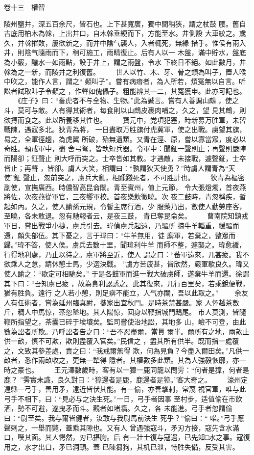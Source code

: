 \documentclass{ctexart}
\begin{document}
卷十三　權智

陵州鹽井，深五百余尺，皆石也。上下甚寬廣，獨中間稍狹，謂之杖鼓 腰。舊自吉底用柏木為榦，上出井口，自木榦垂綆而下，方能至水。井側設 大車絞之。歲久，井榦摧敗，屢欲新之，而井中陰气襲人，入者輒死，無緣 措手。惟侯有雨入井，則陰气隨雨而下，稍可施工，雨睛復止。后有人以一 木盤，滿中貯水，盤底為小竅，釃水一如雨點，設于井上，謂之雨盤，令水 下終日不絕。如此數月，井榦為之一新，而陵井之利復舊。 　　世人以竹、木、牙、骨之類為叫子，置人喉中吹之，能作人言，謂之`` 顙叫子''。嘗有病瘖者，為人所若，煩冤無以自言。听訟者試取叫子令顙之 ，作聲如傀儡子。粗能辨其一二，其冤獲申。此亦可記也。 　　《庄子》曰：``畜虎者不与全物、生物。''此為誠言。嘗有人善調山鷓 ，使之斗，莫可与敵。人有得其術者，每食則以山鷓皮裹肉哺之，久之，望 見其鷓，則欲搏而食之。此以所養移其性也。 　　寶元中，党項犯塞，時新募万胜軍，未習戰陳，遇寇多北。狄青為將， 一日盡取万胜旗付虎冀軍，使之出戰。虜望其旗，易之，全軍徑趨，為虎翼 所破，殆無遺類。又青在涇、原，嘗以寡當眾，度必以奇胜。預戒軍中，盡 舍弓弩，皆執短兵器。令軍中：聞鉦一聲則止；再聲則嚴陣而陽卻；鉦聲止 則大呼而突之。士卒皆如其教。才遇敵，未接戰，遽聲鉦，士卒皆止；再聲 ，皆卻。虜人大笑，相謂曰：``孰謂狄天使勇？''時虜人謂青為``天使''鉦 聲止，忽前突之，虜兵大亂，相蹂踐死者，不可胜計也。 　　狄青為樞密副使，宣撫廣西。時儂智高昆侖關。青至賓州，值上元節， 令大張燈燭，首夜燕將佐，次夜燕從軍官，三夜饗軍校。首夜樂飲徹曉。次 夜二鼓時，青忽稱疾，暫起如內。久之，使人諭孫元規，令暫主席行酒，少 服藥乃出，數使人勤勞座客，至曉，各未敢退。忽有馳報者云，是夜三鼓， 青已奪昆侖矣。 　　曹南院知鎮戎軍日，嘗出戰爭小捷，虜兵引去。瑋偵虜兵起遠，乃驅所 掠牛羊輜重，緩驅而還，頗失部伍。其下憂之，言于瑋曰：``牛羊無用，徒 縻軍，若棄之，整眾而歸。''瑋不答，使人侯。虜兵去數十里，聞瑋利牛羊 而師不整，遽襲之。瑋愈緩，行得地利處，乃止以待之。虜軍將至近，使人 謂之曰：``蕃軍遠來，几甚疲。我不欲乘人之怠，請休憩士馬，少選決戰。 ''虜方苦疲甚，皆欣然，嚴軍歇良久。瑋又使人諭之：``歇定可相馳矣。'' 于是各鼓軍而進一戰大破虜師，遂棄牛羊而還。徐謂其下曰：``吾知虜已疲 ，故為貪利認誘之。此其復來，几行百里矣，若乘銳便戰，猶有胜負。遠行 之人若小憩，則足痹不能立，人气亦闌，吾以此取之。'' 　　余友人有任術者，嘗為延州臨真尉，攜家出宜秋門。是時茶禁甚嚴。家 人怀越茶數斤，稠人中馬惊，茶忽墜地。其人陽惊，回身以鞭指城門鴟尾。 市人莫測，皆隨鞭所指望之，茶囊已碎于埃壤矣。監司嘗使治地訟，其地多 山，嶮不可登，由此數為訟者所欺。乃呼訟者告之曰：``吾不忍盡爾，當貰 爾半。爾所有之地，兩畝止供一畝，慎不可欺，欺則盡覆入官矣。''民信之 ，盡其所有供半。既而指一處覆之，文致其參差處，責之曰：``我戒爾無得 欺，何為見負？今盡入爾田矣。''凡供一畝者，悉作兩畝收之，更無一犁得 隱者。其權數多此類。其為人強毅恢廓，亦一時之豪也。 　　王元澤數歲時，客有以一獐一鹿同籠以問雱：``何者是獐，何者是鹿？ ''雱實未識，良久對曰：``獐邊者是鹿，鹿邊者是獐。''客大奇之。 　　濠州定遠縣一弓手，善用矛，遠近皆伏其能。有一偷，亦善擊剌，常蔑 視官軍，唯与此弓手不相下，曰：``見必与之決生死。''一日，弓手者因事 至村步，适值偷在市飲洒，勢不可避，遂曳矛而斗。觀者如堵牆。久之，各 未能進。弓手者忽謂偷曰：``尉至矣。我与爾皆健者，汝敢与我尉馬前決生 死乎？''偷曰：`` 喏。''弓手應聲剌之，一舉而斃，蓋乘其隙也。又有人 曾遇強寇斗，矛刃方接，寇先含水滿口，噀其面。其人愕然，刃已揕胸。后 有一壯士復与寇遇，已先知□水之事。寇復用之，水才出口，矛已洞頸。蓋 已陳芻狗，其机已泄，恃胜失備，反受其害。 
\end{document}
